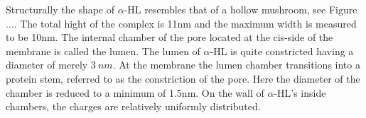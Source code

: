 Structurally the shape of $\alpha$-HL resembles that of a hollow mushroom, see Figure
....
The total hight of the complex is 11nm and the maximum width is measured to be 10nm. The
internal chamber of the pore located at the cis-side of the membrane is called the lumen.
The lumen of $\alpha$-HL is quite constricted having a diameter of merely $3\ nm$.  At
the membrane the lumen chamber transitions into a protein stem, referred to as the
constriction of the pore. Here the diameter of the chamber is reduced to a minimum of
1.5nm. On the wall of $\alpha$-HL's inside chambers, the charges are relatively uniformly
distributed.

%
%
%


